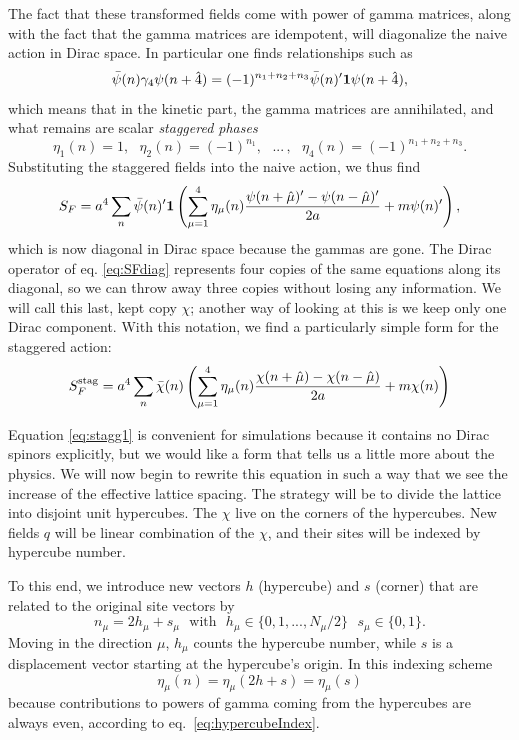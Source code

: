 The fact that these transformed fields come with power of gamma matrices,
along with the fact that the gamma matrices are idempotent, will
diagonalize the naive action in Dirac space. In particular one finds
relationships such as
\begin{equation}
  \bar{\psi}(n)\gamma_4\psi(n+\hat{4})
      =(-1)^{n_1+n_2+n_3}\bar{\psi}(n)'{\mathbf 1}\psi(n+\hat{4}),
\end{equation}
which means that in the kinetic part, the gamma matrices are annihilated,
and what remains are scalar {\it staggered phases}
\begin{equation}
   \eta_1(n)=1, ~~~
   \eta_2(n)=(-1)^{n_1}, ~~~
   ...\,, ~~~
   \eta_4(n)=(-1)^{n_1+n_2+n_3}.
\end{equation}
Substituting the staggered fields
into the naive action, we thus find
\begin{equation}\label{eq:SFdiag}
   S_F
     =a^4\sum_n\bar{\psi}(n)'{\mathbf 1}\left(\sum_{\mu=1}^4\eta_\mu(n)
       \frac{\psi(n+\hat{\mu})'-\psi(n-\hat{\mu})'}{2a}
       +m\psi(n)'\right),
\end{equation}
which is now diagonal in Dirac space because the gammas are gone.
The Dirac operator of eq. \eqref{eq:SFdiag} represents four copies of
the same equations along its diagonal, so we can throw away three copies
without losing any information. We will call this last, kept copy $\chi$;
another way of looking at this is we keep only one Dirac component.
With this notation, we find a particularly simple form for the staggered
action:
\begin{equation}\label{eq:stagg1}
  S_F^{\rm stag}
     =a^4\sum_n\bar{\chi}(n)\left(\sum_{\mu=1}^4\eta_\mu(n)
       \frac{\chi(n+\hat{\mu})-\chi(n-\hat{\mu})}{2a}
       +m\chi(n)\right)
\end{equation}

Equation \eqref{eq:stagg1} is convenient for simulations because it contains no
Dirac spinors explicitly, but we would like a form that tells us a little
more about the physics. We will now begin to rewrite this equation in such
a way that we see the increase of the effective lattice spacing. The
strategy will be to divide the lattice into disjoint unit hypercubes.
The $\chi$ live on the corners of the hypercubes. New fields $q$ will be 
linear combination of the $\chi$, and their sites will be indexed by 
hypercube number.

To this end, we introduce new vectors $h$ (hypercube) and $s$ (corner) that
are related to the original site vectors by
\begin{equation}\label{eq:hypercubeIndex}
  n_\mu=2h_\mu+s_\mu~~~\text{with}~~~h_\mu\in\{0, 1, ..., N_\mu/2\}
                    ~~~s_\mu\in\{0,1\}.
\end{equation}
Moving in the direction $\mu$, $h_\mu$ counts the hypercube number,
while $s$ is a displacement vector starting at the hypercube's origin.
In this indexing scheme
\begin{equation}
  \eta_\mu(n)=\eta_\mu(2h+s)=\eta_\mu(s)
\end{equation}
because contributions to powers of gamma coming from the hypercubes are
always even, according to eq.~\eqref{eq:hypercubeIndex}.

